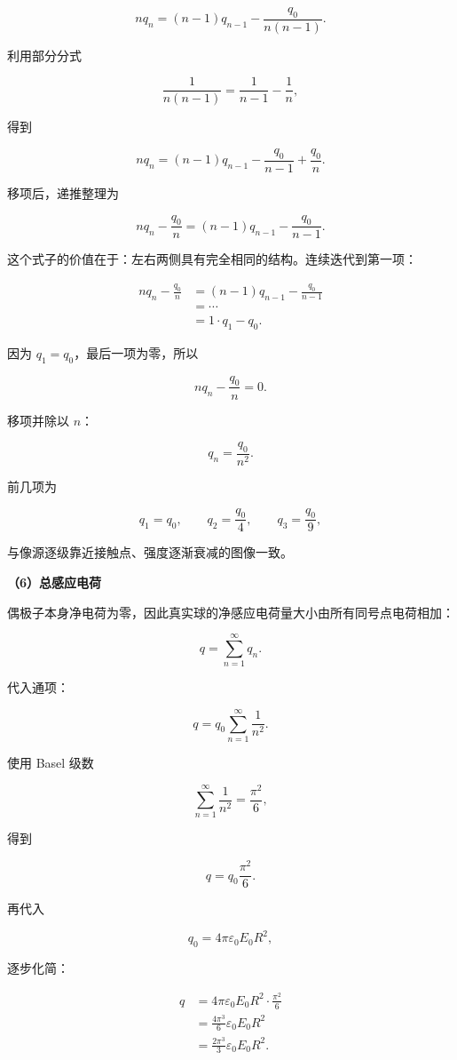 \documentclass[12pt,a4paper,UTF8]{ctexart}
\begin{document}
\[nq_n
=(n-1)q_{n-1}
-\frac{q_0}{n(n-1)}.\]

利用部分分式

\[\frac1{n(n-1)}
=\frac1{n-1}-\frac1n,\]

得到

\[nq_n
=(n-1)q_{n-1}
-\frac{q_0}{n-1}
+\frac{q_0}{n}.\]

移项后，递推整理为

\[nq_n-\frac{q_0}{n}
=(n-1)q_{n-1}-\frac{q_0}{n-1}.\]

这个式子的价值在于：左右两侧具有完全相同的结构。连续迭代到第一项：

\[\begin{aligned}
nq_n-\frac{q_0}{n}
&=(n-1)q_{n-1}-\frac{q_0}{n-1}\\
&=\cdots\\
&=1\cdot q_1-q_0.
\end{aligned}\]

因为 \(q_1=q_0\)，最后一项为零，所以

\[nq_n-\frac{q_0}{n}=0.\]

移项并除以 \(n\)：

\[\boxed{q_n=\frac{q_0}{n^2}}.\]

前几项为

\[q_1=q_0,\qquad
q_2=\frac{q_0}{4},\qquad
q_3=\frac{q_0}{9},\]

与像源逐级靠近接触点、强度逐渐衰减的图像一致。

\textbf{（6）总感应电荷}

偶极子本身净电荷为零，因此真实球的净感应电荷量大小由所有同号点电荷相加：

\[q=\sum_{n=1}^{\infty}q_n.\]

代入通项：

\[q=q_0\sum_{n=1}^{\infty}\frac1{n^2}.\]

使用 Basel 级数

\[\sum_{n=1}^{\infty}\frac1{n^2}=\frac{\pi^2}{6},\]

得到

\[q=q_0\frac{\pi^2}{6}.\]

再代入

\[q_0=4\pi\varepsilon_0E_0R^2,\]

逐步化简：

\[\begin{aligned}
q
&=4\pi\varepsilon_0E_0R^2
\cdot\frac{\pi^2}{6}\\
&=\frac{4\pi^3}{6}
\varepsilon_0E_0R^2\\
&=\frac{2\pi^3}{3}
\varepsilon_0E_0R^2.
\end{aligned}\]
\end{document}
